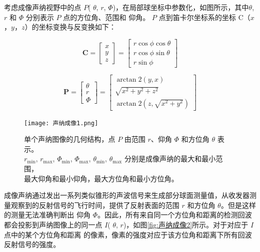 考虑成像声纳视野中的点 $P$( $\theta$, $r$, $\Phi$)，在局部球坐标中参数化，如图所示，其中$\theta$, $r$ 和 $\Phi$ 分别表示 $P$ 点的方位角、范围和
仰角。 $P$ 点到笛卡尔坐标系的坐标 C（$x$，$y$，$z$）的坐标变换与反变换如下：

\begin{equation}
	\mathbf{C} = 
	\left[\!
	\begin{array}{c}
	x \\[1.8mm]
	y \\[1.8mm]
	z
	\end{array}
	\right]
	=
	\left[\!
	\begin{array}{c}
	r \cos\phi \cos\theta \\[1.8mm]
	r \cos\phi \sin\theta \\[1.8mm]
	r \sin\phi
	\end{array}
	\right]
	\label{eq:coord}
\end{equation}

\begin{equation}
	\mathbf{P} =
	\left[\!
	\begin{array}{c}
	\theta \\[1.8mm]
	r     \\[1.8mm]
	\Phi
	\end{array}
	\!\right]
	=
	\left[\!
	\begin{array}{c}
	\arctan2(y,x) \\[1.8mm]
	\sqrt{x^{2}+y^{2}+z^{2}} \\[1.8mm]
	\arctan2\!\left(z,\sqrt{x^{2}+y^{2}}\right)
	\end{array}
	\!\right]
	\label{eq:polar}
\end{equation}



\begin{figure}[ht]
\centering
\texttt{[image: 声纳成像1.png]}
\caption{单个声纳图像的几何结构，点 $P$ 由范围 $r$、仰角 $\Phi$ 和方位角 $\theta$ 表示。\\
  $r_{\min}$, $r_{\max}$, $\Phi_{\min}$, $\Phi_{\max}$, $\theta_{\min}$, $\theta_{\max}$ 分别是成像声纳的最大和最小范围，\\
  最大仰角和最小仰角，最大方位角和最小方位角。}
\label{fig:声纳成像1}
\end{figure}

成像声纳通过发出一系列类似锥形的声波信号来生成部分球面测量值，从收发器测量观察到的反射信号的飞行时间，提供了反射表面的范围 $r$ 和方位角 $\theta$。但是这样的测量无法准确判断出
仰角 $\Phi$。因此，所有来自同一个方位角和距离的检测回波都会投影到声纳图像上的同一点 $I$( $\theta$, $r$)，如图\ref{fig:声纳成像2}所示。对于对应于 $I$ 点中的某个方位角和距离
的像素，像素的强度对应于该方位角和距离下所有回波反射信号的强度。

